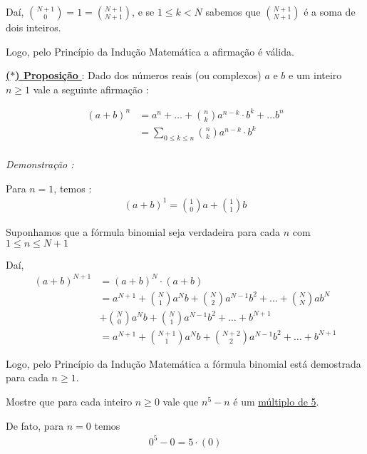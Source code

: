     Daí,
    $\binom{N+1}{0} = 1 = \binom{N+1}{N+1}$, e se $1 \leq k < N$ sabemos que $\binom{N+1}{N+1}$ é a soma de dois inteiros.

    Logo, pelo Princípio da Indução Matemática a afirmação é válida.

    \underline{\underline{ \textbf{\textcolor{cinzaEscuro}{($\ast$) Proposição}} }} : Dado dos números reais (ou complexos) $a$ e $b$ e
    um inteiro $n \ge 1$ vale a seguinte afirmação : 

    \vspace{-1cm}
    \begin{align*}
        (a+b)^n &= a^n + \dotsc + \binom{n}{k}a^{n-k} \cdot b^{k} + \dotsc b^n\\
        &= \sum_{0 \leq k \leq n}^{} \binom{n}{k}a^{n-k} \cdot b^{k}\\
    \end{align*}

    \vspace{2.1cm}
    \textit{Demonstração : }

    Para $n=1$, temos :
    \begin{align*}
        (a+b)^1 = \binom{1}{0}a + \binom{1}{1}b 
    \end{align*}

    Suponhamos que a fórmula binomial seja verdadeira para cada $n$ com $1 \leq n \leq N+1$

    Daí,
    \begin{align*}
        (a+b)^{N+1} &= (a+b)^{N} \cdot (a+b) \\ 
        &= a^{N+1} + \binom{N}{1}a^{N}b + \binom{N}{2}a^{N-1}b^2 + \dotsc + \binom{N}{N}ab^{N} \\
        &+ \binom{N}{0}a^{N}b + \binom{N}{1}a^{N-1}b^2 + \dotsc + b^{N+1} \\
        &= a^{N+1} + \binom{N+1}{1}a^{N}b + \binom{N+2}{2}a^{N-1}b^2 + \dotsc + b^{N+1}
    \end{align*}

    Logo, pelo Princípio da Indução Matemática a fórmula binomial está demostrada para cada $n \ge 1$.

    \vspace{0.5cm}
    
    \begin{exemplo}[]
        Mostre que para cada inteiro $n \ge 0$ vale que $n^5 - n$ é um \underline{múltiplo de 5}.
    \end{exemplo}
    
    De fato, para $n = 0$ temos
    \begin{align*}
        0^5 - 0 = 5 \cdot (0)
    \end{align*}

